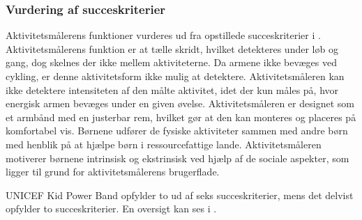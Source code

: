 \subsubsection{Vurdering af succeskriterier}
Aktivitetsmålerens funktioner vurderes ud fra opstillede succeskriterier i . \\
Aktivitetsmålerens funktion er at tælle skridt, hvilket detekteres under løb og gang, dog skelnes der ikke mellem aktiviteterne. Da armene ikke bevæges ved cykling, er denne aktivitetsform ikke mulig at detektere. Aktivitetsmåleren kan ikke detektere intensiteten af den målte aktivitet, idet der kun måles på, hvor energisk armen bevæges under en given øvelse. Aktivitetsmåleren er designet som et armbånd med en justerbar rem, hvilket gør at den kan monteres og placeres på komfortabel vis. \citep{PowerManual2015} \newline
Børnene udfører de fysiske aktiviteter sammen med andre børn med henblik på at hjælpe børn i ressourcefattige lande. Aktivitetsmåleren motiverer børnene intrinsisk og ekstrinsisk ved hjælp af de sociale aspekter, som ligger til grund for aktivitetsmålerens brugerflade.~\citep{PowerAbout2015} 

UNICEF Kid Power Band opfylder to ud af seks succeskriterier, mens det delvist opfylder to succeskriterier. En oversigt kan ses i .

